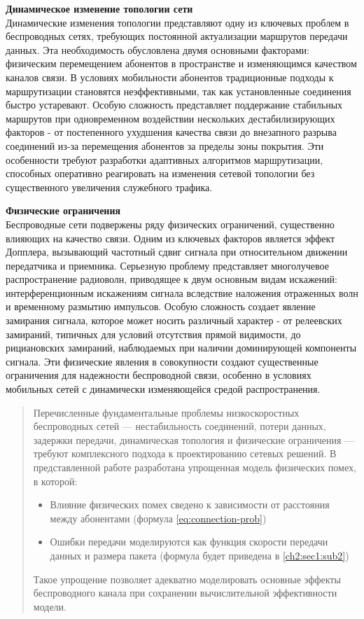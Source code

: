 \noindent\textbf{Динамическое изменение топологии сети} \\
Динамические изменения топологии представляют одну из ключевых проблем в беспроводных сетях, требующих постоянной актуализации маршрутов передачи данных. 
Эта необходимость обусловлена двумя основными факторами: физическим перемещением абонентов в пространстве и изменяющимся качеством каналов связи. В условиях 
мобильности абонентов традиционные подходы к маршрутизации становятся неэффективными, так как установленные соединения быстро устаревают. Особую сложность 
представляет поддержание стабильных маршрутов при одновременном воздействии нескольких дестабилизирующих факторов - от постепенного ухудшения качества 
связи до внезапного разрыва соединений из-за перемещения абонентов за пределы зоны покрытия. Эти особенности требуют разработки адаптивных алгоритмов 
маршрутизации, способных оперативно реагировать на изменения сетевой топологии без существенного увеличения служебного трафика.

\noindent\textbf{Физические ограничения} \\
Беспроводные сети подвержены ряду физических ограничений, существенно влияющих на качество связи. Одним из ключевых факторов является эффект Допплера, 
вызывающий частотный сдвиг сигнала при относительном движении передатчика и приемника. Серьезную проблему представляет многолучевое распространение 
радиоволн, приводящее к двум основным видам искажений: интерференционным искажениям сигнала вследствие наложения отраженных волн и временному размытию 
импульсов. Особую сложность создает явление замирания сигнала, которое может носить различный характер - от релеевских замираний, типичных для условий 
отсутствия прямой видимости, до рициановских замираний, наблюдаемых при наличии доминирующей компоненты сигнала. Эти физические явления в совокупности 
создают существенные ограничения для надежности беспроводной связи, особенно в условиях мобильных сетей с динамически изменяющейся средой распространения.
\\
\begin{quote}
Перечисленные фундаментальные проблемы низкоскоростных беспроводных сетей — нестабильность соединений, потери данных, задержки передачи, динамическая 
топология и физические ограничения — требуют комплексного подхода к проектированию сетевых решений. В представленной работе разработана упрощенная модель 
физических помех, в которой:

\begin{itemize}
\item Влияние физических помех сведено к зависимости от расстояния между абонентами (формула \ref{eq:connection-prob})
\item Ошибки передачи моделируются как функция скорости передачи данных и размера пакета (формула будет приведена в \ref{ch2:sec1:sub2})
\end{itemize}

Такое упрощение позволяет адекватно моделировать основные эффекты беспроводного канала при сохранении вычислительной эффективности модели.
\end{quote}

